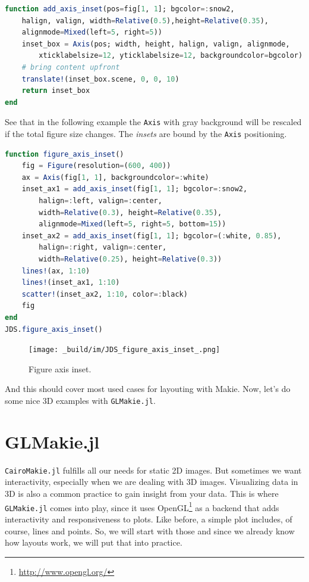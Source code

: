 \documentclass[
  notoc %
]{tufte-book}
\DeclareRobustCommand{\href}[2]{#2\footnote{\url{#1}}}
\newcommand{\passthrough}[1]{#1}
\begin{document}
\begin{lstlisting}[language=Julia]
function add_axis_inset(pos=fig[1, 1]; bgcolor=:snow2,
    halign, valign, width=Relative(0.5),height=Relative(0.35),
    alignmode=Mixed(left=5, right=5))
    inset_box = Axis(pos; width, height, halign, valign, alignmode,
        xticklabelsize=12, yticklabelsize=12, backgroundcolor=bgcolor)
    # bring content upfront
    translate!(inset_box.scene, 0, 0, 10)
    return inset_box
end
\end{lstlisting}

See that in the following example the \passthrough{\lstinline!Axis!}
with gray background will be rescaled if the total figure size changes.
The \emph{insets} are bound by the \passthrough{\lstinline!Axis!}
positioning.

\begin{lstlisting}[language=Julia]
function figure_axis_inset()
    fig = Figure(resolution=(600, 400))
    ax = Axis(fig[1, 1], backgroundcolor=:white)
    inset_ax1 = add_axis_inset(fig[1, 1]; bgcolor=:snow2,
        halign=:left, valign=:center,
        width=Relative(0.3), height=Relative(0.35),
        alignmode=Mixed(left=5, right=5, bottom=15))
    inset_ax2 = add_axis_inset(fig[1, 1]; bgcolor=(:white, 0.85),
        halign=:right, valign=:center,
        width=Relative(0.25), height=Relative(0.3))
    lines!(ax, 1:10)
    lines!(inset_ax1, 1:10)
    scatter!(inset_ax2, 1:10, color=:black)
    fig
end
JDS.figure_axis_inset()
\end{lstlisting}

\begin{figure}
\hypertarget{fig:figure_axis_inset}{%
\centering
\texttt{[image: \_build/im/JDS\_figure\_axis\_inset\_.png]}
\caption{Figure axis inset.}\label{fig:figure_axis_inset}
}
\end{figure}

And this should cover most used cases for layouting with Makie. Now,
let's do some nice 3D examples with
\passthrough{\lstinline!GLMakie.jl!}.

\hypertarget{sec:glmakie}{%
\section{GLMakie.jl}\label{sec:glmakie}}

\passthrough{\lstinline!CairoMakie.jl!} fulfills all our needs for
static 2D images. But sometimes we want interactivity, especially when
we are dealing with 3D images. Visualizing data in 3D is also a common
practice to gain insight from your data. This is where
\passthrough{\lstinline!GLMakie.jl!} comes into play, since it uses
\href{http://www.opengl.org/}{OpenGL} as a backend that adds
interactivity and responsiveness to plots. Like before, a simple plot
includes, of course, lines and points. So, we will start with those and
since we already know how layouts work, we will put that into practice.
\end{document}
